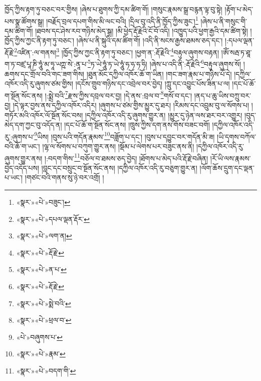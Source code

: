 ཁྱོད་ཀྱིས་རྟག་ཏུ་བཅང་བར་གྱིས། །ཞེས་པ་ཐུགས་ཀྱི་དམ་ཚིག་གོ། །གསུང་རྣམས་སྒྲ་བརྙན་ལྟ་བུ་སྟེ། །རྟོག་པ་མེད་པས་སྣ་ཚོགས་སྒྲ། །བརྗོད་བྲལ་དཔག་གིས་མི་ལང་བའི། །དྲིལ་བུ་འདི་ནི་ཁྱོད་ཀྱིས་ཟུང་།\footnote{«སྣར་»«པེ་»བཟུང་།} །ཞེས་པ་ནི་གསུང་གི་དམ་ཚིག་གོ། །ཐབས་དང་ཤེས་རབ་གཉིས་མེད་སྒྲ། །མི་ཕྱེད་རྡོ་རྗེའི་ངོ་བོ་འདི། །འཁྱུད་པའི་ཕྱག་རྒྱའི་དམ་ཚིག་སྟེ། །ཁྱོད་ཀྱིས་ཀྱང་ནི་རྟག་ཏུ་བཅང་། །ཞེས་པ་ནི་སྐུའི་དམ་ཚིག་གོ། །འདི་ནི་སངས་རྒྱས་ཐམས་ཅད་དང་། །:དཔལ་ལྡན་རྡོ་རྗེ་\footnote{«སྣར་»«པེ་»དཔལ་ལྡན་རྡོར་}འཛིན་:ལ་གནས།\footnote{«སྣར་»«པེ་»ལག་ན།} །ཁྱོད་ཀྱིས་ཀྱང་ནི་རྟག་ཏུ་བཅང་། །ཕྱག་ན་:རྡོ་རྗེའི་\footnote{«སྣར་»«པེ་»རྡོ་རྗེ་}བརྟུལ་ཞུགས་བརྟན། །ཨོཾ་སརྦ་ཏ་ཐཱ་ག་ཏ་བཛྲ་པཱ་ཎི་ཧཱུཾ་མ་ཧཱ་ཡཀྵ་སེ་:ནཱ་པ་\footnote{«སྣར་»«པེ་»ན་པ་}ཏ་ཡེ་ཧཱུཾ་ཏ་ཡེ་ཧཱུཾ་ཧ་ཧ་ཧ་ཧི། །ཞེས་པ་འདི་ནི་:རྡོ་རྗེའི་\footnote{«སྣར་»«པེ་»རྡོ་རྗེ་}བརྟུལ་ཞུགས་སོ། །ཆགས་དང་གྲོལ་བའི་གང་ཟག་གིས། །ཐུན་མོང་དཀྱིལ་འཁོར་ཆོ་ག་ཡིན། །གང་ཟག་རྣམ་པ་གཉིས་པོ་དེ། །དཀྱིལ་འཁོར་འདི་རུ་ཞུགས་ཙམ་གྱིས། །དངོས་གྲུབ་གཉིས་དང་འབྲེལ་བར་བྱེད། །ཀླུ་དང་འབྱུང་པོས་ཟིན་པ་ལ། །དང་པོ་ཆོ་ག་སྔོན་སོང་ནས། །:སྨྲེ་བའི་\footnote{«སྣར་»«པེ་»སྨེ་བའི་}རྫས་ཀྱིས་དབྲལ་བར་བྱ། །དེ་ནས་:བྲལ་བ་\footnote{«སྣར་»«པེ་»ཕྲལ་བ་}གསོ་བ་དང་། །ནད་པ་ཆུ་ཡིས་བཀྲུ་བར་བྱ། །དེ་ལྟར་བྱས་ནས་དཀྱིལ་འཁོར་འདིར། །ཞུགས་པ་ཙམ་གྱིས་མྱུར་དུ་ཐར། །རིམས་དང་འབྲུམ་བུ་ལ་སོགས་པ། །གཏོར་མའི་འཁོར་ལོ་སྔོན་སོང་བས། །དཀྱིལ་འཁོར་འདི་རུ་ཞུགས་གྱུར་ན། །མྱུར་དུ་ཉེན་ལས་ཐར་བར་འགྱུར། །བུད་མེད་དག་ཀྱང་བུ་འདོད་ན། །དང་པོ་ཆོ་ག་སྔོན་སོང་ནས། །ཁྲུས་ཀྱིས་དག་ནས་གོས་བཟང་བགོ། །དཀྱིལ་འཁོར་འདི་རུ་:ཞུགས་པ་\footnote{«པེ་»བཞུགས་པ་}ཡིས། །བུས་པའི་གདོན་རྣམས་\footnote{«སྣར་»«པེ་»རྣམ་}བཟློག་པ་དང་། །བུས་པ་དབྱུང་བར་གདོན་མི་ཟ། །ཡི་དྭགས་བཀོལ་བའི་ཆོ་ག་ཡང་། །ལྷ་ལ་སོགས་པ་བཀུག་གྱུར་ནས། །སྡོམ་པ་ལེགས་པར་བཟུང་ནས་ནི། །དཀྱིལ་འཁོར་འདི་རུ་ཞུགས་གྱུར་ནས། །:བདག་གིས་\footnote{«སྣར་»«པེ་»བདག་གི་}བཅོལ་བ་ཐམས་ཅད་བྱེད། །ཐོགས་པ་མེད་པའི་རྡོ་རྗེ་བཞིན། །རོ་ཡི་ལས་རྣམས་བྱེད་འདོད་པས། །བླང་དང་བསྲུང་བ་སྔོན་སོང་ནས། །དཀྱིལ་འཁོར་འདི་རུ་བཅུག་གྱུར་ན། །ལོག་ཆོས་དྲུག་དང་ལྡན་པ་ཡང་། །གཙང་བའི་གནས་སུ་ཉེ་བར་འགྲོ། །
